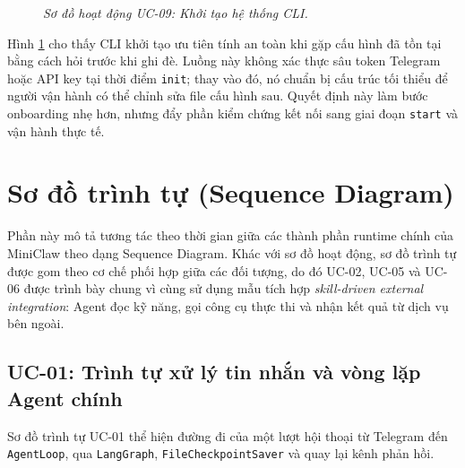 \begin{figure}[p]
{
  }
  \caption{\emph{Sơ đồ hoạt động UC-09: Khởi tạo hệ thống CLI.}}
  \label{fig:activity-uc09}
\end{figure}
\clearpage

Hình \ref{fig:activity-uc09} cho thấy CLI khởi tạo ưu tiên tính an toàn khi gặp cấu hình đã tồn tại bằng cách hỏi trước khi ghi đè. Luồng này không xác thực sâu token Telegram hoặc API key tại thời điểm \texttt{init}; thay vào đó, nó chuẩn bị cấu trúc tối thiểu để người vận hành có thể chỉnh sửa file cấu hình sau. Quyết định này làm bước onboarding nhẹ hơn, nhưng đẩy phần kiểm chứng kết nối sang giai đoạn \texttt{start} và vận hành thực tế.

\section{Sơ đồ trình tự (Sequence Diagram)}
Phần này mô tả tương tác theo thời gian giữa các thành phần runtime chính của MiniClaw theo dạng Sequence Diagram. Khác với sơ đồ hoạt động, sơ đồ trình tự được gom theo cơ chế phối hợp giữa các đối tượng, do đó UC-02, UC-05 và UC-06 được trình bày chung vì cùng sử dụng mẫu tích hợp \textit{skill-driven external integration}: Agent đọc kỹ năng, gọi công cụ thực thi và nhận kết quả từ dịch vụ bên ngoài.

\subsection{UC-01: Trình tự xử lý tin nhắn và vòng lặp Agent chính}
Sơ đồ trình tự UC-01 thể hiện đường đi của một lượt hội thoại từ Telegram đến \texttt{AgentLoop}, qua \texttt{LangGraph}, \texttt{FileCheckpointSaver} và quay lại kênh phản hồi.

